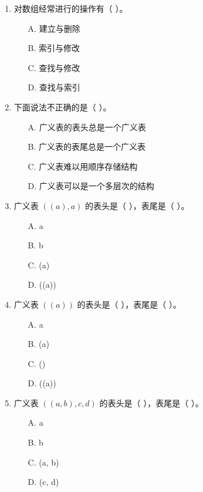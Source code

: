 \documentclass[12pt, a4paper]{article}
\begin{document}
\begin{enumerate}
    \item 对数组经常进行的操作有（ ）。
    \begin{enumerate}
        \item[A.] 建立与删除
        \item[B.] 索引与修改
        \item[C.] 查找与修改
        \item[D.] 查找与索引
    \end{enumerate}
    
    \item 下面说法不正确的是（ ）。
    \begin{enumerate}
        \item[A.] 广义表的表头总是一个广义表
        \item[B.] 广义表的表尾总是一个广义表
        \item[C.] 广义表难以用顺序存储结构
        \item[D.] 广义表可以是一个多层次的结构
    \end{enumerate}
    
    \item 广义表 $((a), a)$ 的表头是（ ），表尾是（ ）。
    \begin{enumerate}
        \item[A.] a
        \item[B.] b
        \item[C.] (a)
        \item[D.] ((a))
    \end{enumerate}
    
    \item 广义表 $((a))$ 的表头是（ ），表尾是（ ）。
    \begin{enumerate}
        \item[A.] a
        \item[B.] (a)
        \item[C.] ()
        \item[D.] ((a))
    \end{enumerate}
    
    \item 广义表 $((a,b),c,d)$ 的表头是（ ），表尾是（ ）。
    \begin{enumerate}
        \item[A.] a
        \item[B.] b
        \item[C.] (a, b)
        \item[D.] (c, d)
    \end{enumerate}
    

\end{enumerate}
\end{document}
